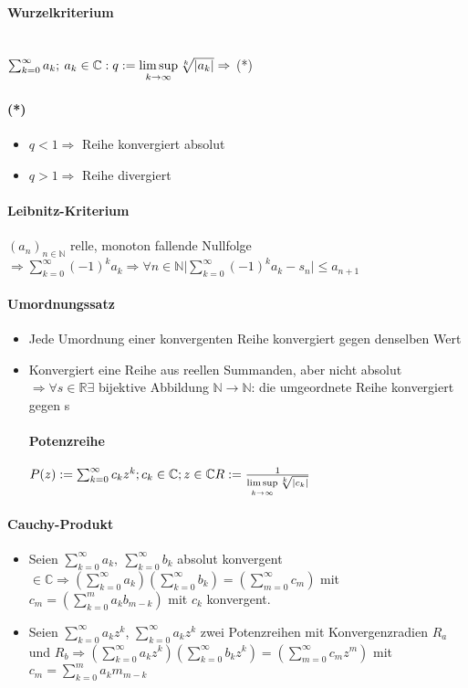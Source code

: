 \documentclass[paper=a3,paper=landscape, fontsize=9pt,DIV=25]{scrartcl}
\newcommand{\real}{{\mathbb{R}}}
\newcommand{\compl}{\mathbb{C}}
\newcommand{\nat}{\mathbb{N}}
\newcommand{\aseq}{(a_n)_{n \in \nat}}
\begin{document}
\begin{multicols*}{4}
		\paragraph{Wurzelkriterium}\hspace{0pt} \\
		$ \sum_{k=0}^{\infty} a_k;\:a_k \in \compl: q := \limsup\limits_{k \rightarrow \infty} \sqrt[k]{\arrowvert a_k \arrowvert} \Rightarrow$ (*)
		\paragraph{(*)}
		\begin{itemize}
			\item $q < 1 \Rightarrow$ Reihe konvergiert absolut
			\item $q > 1 \Rightarrow$ Reihe divergiert
		\end{itemize}
		\paragraph{Leibnitz-Kriterium}
		$\aseq$ relle, monoton fallende Nullfolge $ \Rightarrow \sum_{k=0}^{\infty} (-1)^ka_k \Rightarrow \forall n \in \nat \lvert \sum_{k=0}^{\infty}(-1)^ka_k-s_n \rvert \leq  a_{n+1}$
		\paragraph{Umordnungssatz}\begin{itemize}
			\item Jede Umordnung einer konvergenten Reihe konvergiert gegen denselben Wert
			\item Konvergiert eine Reihe aus reellen Summanden, aber nicht absolut $\Rightarrow \forall s \in \real \exists$ bijektive Abbildung $\nat \rightarrow \nat$: die umgeordnete Reihe konvergiert gegen s
		\paragraph{Potenzreihe}
		$ P(z) := \sum_{k=0}^{\infty} c_kz^k; c_k \in \compl; z \in \compl\\R := \frac{1}{\limsup\limits_{k \rightarrow \infty} \sqrt[k]{|c_k|}}$
		\end{itemize}
		\paragraph{Cauchy-Produkt}
		\begin{itemize}
			\item Seien $ \sum_{k=0}^{\infty} a_k,\:\sum_{k=0}^{\infty} b_k$ absolut konvergent $ \in \compl \Rightarrow (\sum_{k=0}^{\infty} a_k) (\sum_{k=0}^{\infty} b_k) = (\sum_{m=0}^{\infty} c_m)$ mit $ c_m=(\sum_{k=0}^{m} a_kb_{m-k})$ mit $c_k$ konvergent.
			\item Seien $ \sum_{k=0}^{\infty} a_kz^k$, $\sum_{k=0}^{\infty} a_kz^k$ zwei Potenzreihen mit Konvergenzradien $R_a$ und $ R_b \Rightarrow (\sum_{k=0}^{\infty} a_kz^k)(\sum_{k=0}^{\infty} b_kz^k)=(\sum_{m=0}^{\infty} c_mz^m)$ mit $ c_m = \sum_{k=0}^{m} a_km_{m-k}$
		\end{itemize}

\end{multicols*}
\end{document}
